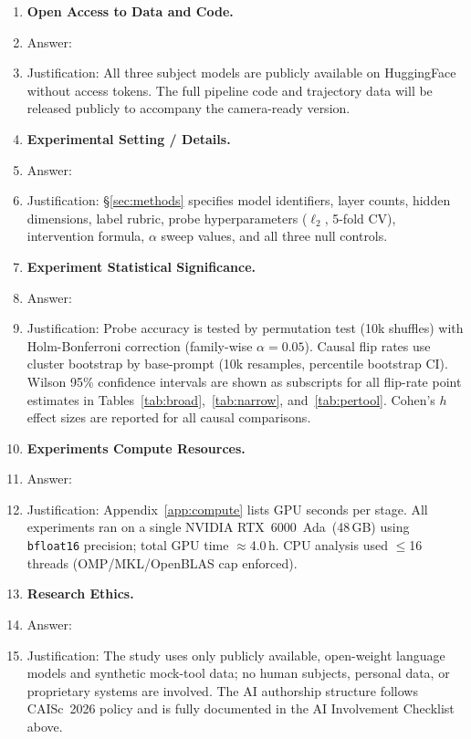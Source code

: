\documentclass{article}
\begin{document}
\begin{enumerate}
\item \textbf{Open Access to Data and Code.}
\item[] Answer: \answerNo{}
\item[] Justification: All three subject models are publicly
available on HuggingFace without access tokens.  The full pipeline
code and trajectory data will be released publicly to accompany the
camera-ready version.

\item \textbf{Experimental Setting / Details.}
\item[] Answer: \answerYes{}
\item[] Justification: \S\ref{sec:methods} specifies model identifiers,
layer counts, hidden dimensions, label rubric, probe hyperparameters
($\ell_2$, 5-fold CV), intervention formula, $\alpha$ sweep values,
and all three null controls.

\item \textbf{Experiment Statistical Significance.}
\item[] Answer: \answerYes{}
\item[] Justification: Probe accuracy is tested by permutation test
(10k shuffles) with Holm-Bonferroni correction (family-wise
$\alpha{=}0.05$).  Causal flip rates use cluster bootstrap by
base-prompt (10k resamples, percentile bootstrap CI).  Wilson 95\%
confidence intervals are shown as subscripts for all flip-rate
point estimates in Tables~\ref{tab:broad},~\ref{tab:narrow},
and~\ref{tab:pertool}.  Cohen's $h$ effect sizes are
reported for all causal comparisons.

\item \textbf{Experiments Compute Resources.}
\item[] Answer: \answerYes{}
\item[] Justification: Appendix~\ref{app:compute} lists GPU seconds
per stage.  All experiments ran on a single NVIDIA RTX~6000~Ada~(48\,GB)
using \texttt{bfloat16} precision; total GPU time $\approx$4.0\,h.
CPU analysis used $\leq$16 threads (OMP/MKL/OpenBLAS cap enforced).

\item \textbf{Research Ethics.}
\item[] Answer: \answerYes{}
\item[] Justification: The study uses only publicly available,
open-weight language models and synthetic mock-tool data; no human
subjects, personal data, or proprietary systems are involved.
The AI authorship structure follows CAISc~2026 policy and is fully
documented in the AI Involvement Checklist above.


\end{enumerate}
\end{document}
